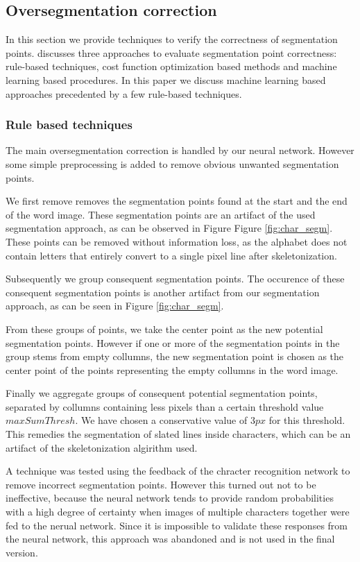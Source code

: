 \documentclass{article}
\begin{document}
\subsection{Oversegmentation correction}
In this section we provide techniques to verify the correctness of segmentation points.
\cite{evalsplitpoints} discusses three approaches to evaluate segmentation point correctness: rule-based techniques, cost function optimization based methods and machine learning based procedures.
In this paper we discuss machine learning based approaches precedented by a few rule-based techniques.

\subsubsection{Rule based techniques}
The main oversegmentation correction is handled by our neural network.
However some simple preprocessing is added to remove obvious unwanted segmentation points.

We first remove removes the segmentation points found at the start and the end of the word image.
These segmentation points are an artifact of the used segmentation approach, as can be observed in Figure Figure \ref{fig:char_segm}.
These points can be removed without information loss, as the alphabet does not contain letters that entirely convert to a single pixel line after skeletonization.

Subsequently we group consequent segmentation points.
The occurence of these consequent segmentation points is another artifact from our segmentation approach, as can be seen in Figure \ref{fig:char_segm}.

From these groups of points, we take the center point as the new potential segmentation points.
However if one or more of the segmentation points in the group stems from empty collumns, the new segmentation point is chosen as the center point of the points representing the empty collumns in the word image.

Finally we aggregate groups of consequent potential segmentation points, separated by collumns containing less pixels than a certain threshold value $maxSumThresh$.
We have chosen a conservative value of $3px$ for this threshold.
This remedies the segmentation of slated lines inside characters, which can be an artifact of the skeletonization algirithm used.

A technique was tested using the feedback of the chracter recognition network to remove incorrect segmentation points.
However this turned out not to be ineffective, because the neural network tends to provide random probabilities with a high degree of certainty when images of multiple characters together were fed to the nerual network.
Since it is impossible to validate these responses from the neural network, this approach was abandoned and is not used in the final version.
\end{document}
